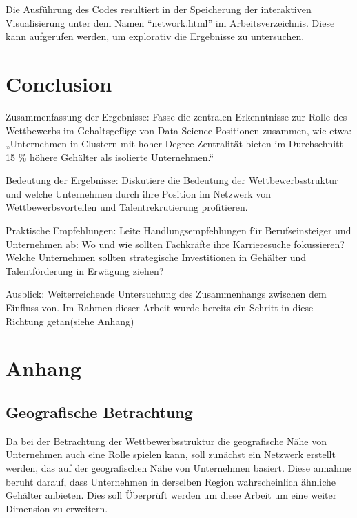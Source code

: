 \documentclass[
]{article}
\begin{document}
Die Ausführung des Codes resultiert in der Speicherung der interaktiven
Visualisierung unter dem Namen ``network.html'' im Arbeitsverzeichnis.
Diese kann aufgerufen werden, um explorativ die Ergebnisse zu
untersuchen.

\newpage

\section{Conclusion}\label{conclusion}

Zusammenfassung der Ergebnisse: Fasse die zentralen Erkenntnisse zur
Rolle des Wettbewerbs im Gehaltsgefüge von Data Science-Positionen
zusammen, wie etwa: „Unternehmen in Clustern mit hoher
Degree-Zentralität bieten im Durchschnitt 15 \% höhere Gehälter als
isolierte Unternehmen.``

Bedeutung der Ergebnisse: Diskutiere die Bedeutung der
Wettbewerbsstruktur und welche Unternehmen durch ihre Position im
Netzwerk von Wettbewerbsvorteilen und Talentrekrutierung profitieren.

Praktische Empfehlungen: Leite Handlungsempfehlungen für
Berufseinsteiger und Unternehmen ab: Wo und wie sollten Fachkräfte ihre
Karrieresuche fokussieren? Welche Unternehmen sollten strategische
Investitionen in Gehälter und Talentförderung in Erwägung ziehen?

Ausblick: Weiterreichende Untersuchung des Zusammenhangs zwischen dem
Einfluss von. Im Rahmen dieser Arbeit wurde bereits ein Schritt in diese
Richtung getan(siehe Anhang)

\newpage

\section{Anhang}\label{anhang}

\subsection{Geografische Betrachtung}\label{geografische-betrachtung}

Da bei der Betrachtung der Wettbewerbsstruktur die geografische Nähe von
Unternehmen auch eine Rolle spielen kann, soll zunächst ein Netzwerk
erstellt werden, das auf der geografischen Nähe von Unternehmen basiert.
Diese annahme beruht darauf, dass Unternehmen in derselben Region
wahrscheinlich ähnliche Gehälter anbieten. Dies soll Überprüft werden um
diese Arbeit um eine weiter Dimension zu erweitern.
\end{document}
